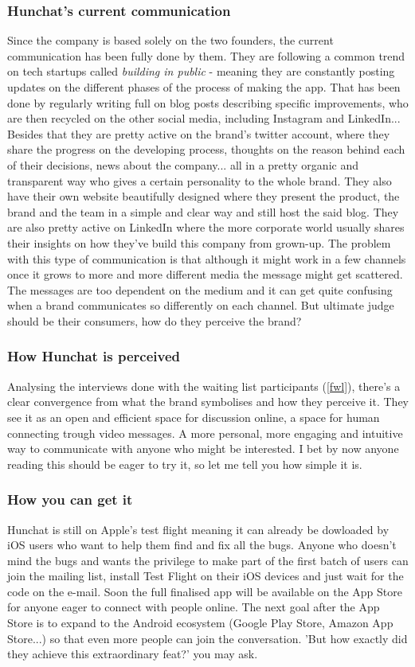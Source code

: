 \documentclass[12pt]{article}
\begin{document}
	\subsubsection{Hunchat's current communication}
Since the company is based solely on the two founders, the current communication has been  fully done by them. They are following a common trend on tech startups called \textit{building in public} - meaning they are constantly posting updates on the different phases of the process of making the app. That has been done by regularly writing full on blog posts describing specific improvements, who are then recycled on the other social media, including Instagram and LinkedIn... Besides that they are pretty active on the brand's twitter account, where they share the progress on the developing process, thoughts on the reason behind each of their decisions, news about the company... all in a pretty organic and transparent way who gives a certain personality to the whole brand. They also have their own website beautifully designed where they present the product, the brand and the team in a simple and clear way and still host the said blog. They are also pretty active on LinkedIn where the more corporate world usually shares their insights on how they've build this company from grown-up. The problem with this type of communication is that although it might work in a few channels once it grows to more and more different media the message might get scattered. The messages are too dependent on the medium and it can get quite confusing when a brand communicates so differently on each channel. But ultimate judge should be their consumers, how do they perceive the brand?

	\subsubsection{How Hunchat is perceived}
Analysing the interviews done with the waiting list participants (\ref{fwl}), there's a clear convergence from what the brand symbolises and how they perceive it. They see it as an open and efficient space for discussion online, a space for human connecting trough video messages. A more personal, more engaging and intuitive way to communicate with anyone who might be interested. I bet by now anyone reading this should be eager to try it, so let me tell you how simple it is.

	\subsubsection{How you can get it}
Hunchat is still on Apple's test flight meaning it can already be dowloaded by iOS users who want to help them find and fix all the bugs. Anyone who doesn't mind the bugs and wants the privilege to make part of the first batch of users can join the mailing list, install Test Flight on their iOS devices and just wait for the code on the e-mail.  Soon the full finalised app will be available on the App Store for anyone eager to connect with people online. The next goal after the App Store is to expand to the Android ecosystem (Google Play Store, Amazon App Store...)  so that even more people can join the conversation. 'But how exactly did they achieve this extraordinary feat?' you may ask.
\end{document}
